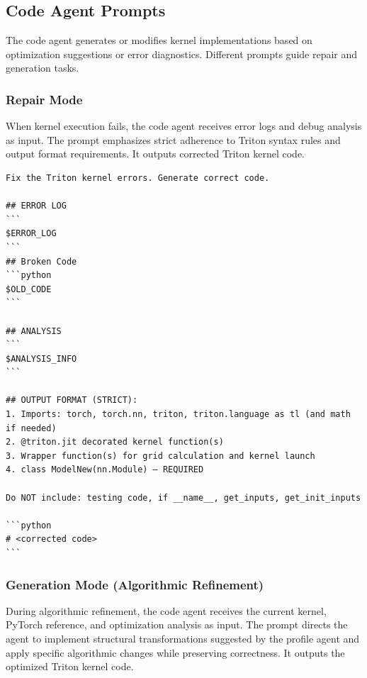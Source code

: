 \subsection{Code Agent Prompts}

The code agent generates or modifies kernel implementations based on optimization suggestions or error diagnostics. Different prompts guide repair and generation tasks.

\subsubsection{Repair Mode}

When kernel execution fails, the code agent receives error logs and debug analysis as input. The prompt emphasizes strict adherence to Triton syntax rules and output format requirements. It outputs corrected Triton kernel code.

\begin{mdframed}[linewidth=1pt, linecolor=black, backgroundcolor=gray!5]
\begin{lstlisting}
Fix the Triton kernel errors. Generate correct code.

## ERROR LOG
```
$ERROR_LOG
```
## Broken Code
```python
$OLD_CODE
```

## ANALYSIS
```
$ANALYSIS_INFO
```

## OUTPUT FORMAT (STRICT):
1. Imports: torch, torch.nn, triton, triton.language as tl (and math if needed)
2. @triton.jit decorated kernel function(s)
3. Wrapper function(s) for grid calculation and kernel launch
4. class ModelNew(nn.Module) — REQUIRED

Do NOT include: testing code, if __name__, get_inputs, get_init_inputs

```python
# <corrected code>
```
\end{lstlisting}
\end{mdframed}

\subsubsection{Generation Mode (Algorithmic Refinement)}

During algorithmic refinement, the code agent receives the current kernel, PyTorch reference, and optimization analysis as input. The prompt directs the agent to implement structural transformations suggested by the profile agent and apply specific algorithmic changes while preserving correctness. It outputs the optimized Triton kernel code.

